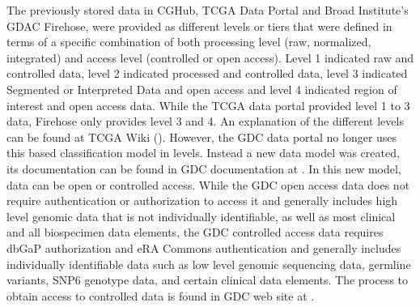 The previously stored data in CGHub, TCGA Data Portal and Broad Institute’s GDAC Firehose, were provided as different levels or tiers that were defined in terms of a specific combination of both processing level (raw, normalized, integrated) and access level (controlled or open access). Level 1 indicated raw and controlled data, level 2 indicated processed and controlled data, level 3 indicated Segmented or Interpreted Data and open access and level 4 indicated region of interest and open access data. While the TCGA data portal provided level 1 to 3 data, Firehose only provides level 3 and 4. An explanation of the different levels can be found at TCGA Wiki (). However, the GDC data portal no longer uses this based classification model in levels. Instead a new data model was created, its documentation can be found in GDC documentation at . In this new model, data can be open or controlled access. While the GDC open access data does not require authentication or authorization to access it and generally includes high level genomic data that is not individually identifiable, as well as most clinical and all biospecimen data elements, the GDC controlled access data requires dbGaP authorization and eRA Commons authentication and generally includes individually identifiable data such as low level genomic sequencing data, germline variants, SNP6 genotype data, and certain clinical data elements. The process to obtain access to controlled data is found in GDC web site at .

